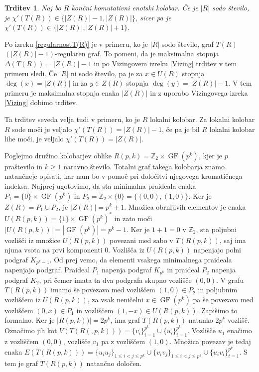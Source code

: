 \documentclass[a4paper, 12pt]{amsart}
\theoremstyle{definition} %
\theoremstyle{plain} %
\newtheorem{trditev}[definicija]{Trditev}
\newcommand{\Z}{\mathbb Z}
\DeclareMathOperator{\GF}{GF}
\begin{document}
\begin{trditev}
Naj bo $R$ končni komutativni enotski kolobar.  Če je $|R|$ sodo število, je $\chi'(T(R)) \in\{|Z(R)|-1, |Z(R)|\}$, sicer pa je $\chi'(T(R)) \in \{|Z(R)|, |Z(R)| +1\}$.
\end{trditev}

\proof
Po izreku \ref{regularnostT(R)} je v primeru, ko je $|R|$ sodo število, graf $T(R)$ $(|Z(R)| - 1)$-regularen graf. To pomeni, da je maksimalna stopnja $\Delta(T(R)) = |Z(R)|-1$ in po Vizingovem izreku \ref{Vizing} trditev v tem primeru sledi. Če $|R|$ ni sodo število, pa je za $x\in U(R)$ stopnja $\deg(x) = |Z(R)|$ in za $y \in Z(R)$ stopnja $\deg(y) = |Z(R)| - 1$. V tem primeru je maksimalna stopnja enaka $|Z(R)|$ in z uporabo Vizingovega izreka \ref{Vizing} dobimo trditev.
\endproof

Ta trditev seveda velja tudi v primeru, ko je $R$ lokalni kolobar. Za lokalni kolobar $R$ sode moči je veljalo $\chi'(T(R)) = |Z(R)| -1$, če pa je bil $R$ lokalni kolobar lihe moči, je veljalo $\chi'(T(R)) = |Z(R)|$.

Poglejmo družino kolobarjev oblike $R(p,k) = \Z_2 \times \GF(p^k)$, kjer je $p$ praštevilo in $k\ge1$ naravno število. Totalni graf takega kolobarja znamo natančneje opisati, kar nam bo v pomoč pri določitvi njegovega kromatičnega indeksa. Najprej ugotovimo, da sta minimalna praideala enaka $P_1= \{0\} \times \GF(p^k)$ in $P_2 = \Z_2 \times \{0\} = \{(0,0),(1,0)\}$. Ker je $Z(R) = P_1 \cup P_2$, je $|Z(R)| = p^k + 1$. Množica obrnljivih elementov je enaka $U(R(p,k)) = \{1\} \times \GF(p^k)^*$ in zato moči $|U(R(p,k))| = |\GF(p^k)| = p^k - 1$. Ker je $1+1=0$ v $\Z_2$, sta poljubni vozlišči iz množice $U(R(p,k))$ povezani med sabo v $T(R(p,k))$, saj ima njuna vsota na prvi komponenti 0. Vozlišča iz $U(R(p,k))$ napenjajo polni podgraf $K_{p^k -1}$. Od prej vemo, da elementi vsakega minimalnega praideala napenjajo podgraf. Praideal $P_1$ napenja podgraf $K_{p^k}$ in praideal $P_2$ napenja podgraf $K_2$, pri čemer imata ta dva podgrafa skupno vozlišče $(0,0)$. V grafu $T(R(p,k))$ imamo še povezavo med vozliščem $(1,0)\in P_2$ in poljubnim vozliščem iz $U(R(p,k))$, za vsak neničelni $x\in \GF(p^k)$ pa še  povezavo med vozliščem $(0,x)\in P_1$ in vozliščem $(1,-x)\in U(R(p,k))$. Zapišimo to formalno. Ker je $|R(p,k))| = 2p^k$, ima graf $T(R(p,k))$ natanko $2p^k$ vozlišč. Označimo jih kot $V(T(R(,p,k))) = \{v_i\}_{i=1}^{p^k} \cup \{u_i\}_{i=1}^{p^k}$. Vozlišče $u_1$ enačimo z vozliščem $(0,0)$, vozlišče $v_1$ pa z vozliščem $(1,0)$. Množica povezav je tedaj enaka $E(T(R(p,k))) = \{u_i u_j\}_{1\le i < j \le p^k} \cup \{v_i v_j\}_{1\le i < j \le p^k} \cup \{u_i v_i\}_{i=1}^{p^k}$. S tem je graf $T(R(p,k))$ natančno določen.
\end{document}
